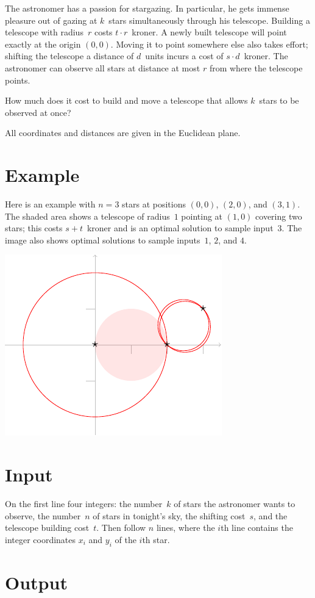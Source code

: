 
\noindent
The astronomer has a passion for stargazing.
In particular, he gets immense pleasure out of gazing at $k$~stars simultaneously through his telescope.   
Building a telescope with radius~$r$ costs $t\cdot r$~kroner.
A newly built telescope will point exactly at the origin $(0,0)$.
Moving it to point somewhere else also takes effort; 
shifting the telescope a distance of $d$~units incurs a cost of $s\cdot d$~kroner.
The astronomer can observe all stars at distance at most $r$ from where the telescope points.

How much does it cost to build and move a telescope that allows $k$~stars to be observed at once?

\medskip

All coordinates and distances are given in the Euclidean plane.


\section*{Example}

Here is an example with $n=3$ stars at positions $(0,0)$, $(2,0)$, and $(3,1)$.
The shaded area shows a telescope of radius~$1$ pointing at $(1,0)$ covering two stars; this costs $s + t$~kroner and is an optimal solution to sample input~$3$.
The image also shows optimal solutions to sample inputs~$1$, $2$, and $4$.

\medskip
\noindent
\includegraphics[width=.3\textwidth]{img/samples.pdf}


\section*{Input}

On the first line four integers:
the number~$k$ of stars the astronomer wants to observe,
the number~$n$ of stars in tonight's sky,
the shifting cost~$s$, and
the telescope building cost~$t$.
Then follow $n$ lines, where the $i$th line contains the integer coordinates $x_i$ and $y_i$ of the $i$th star.

\section*{Output}

